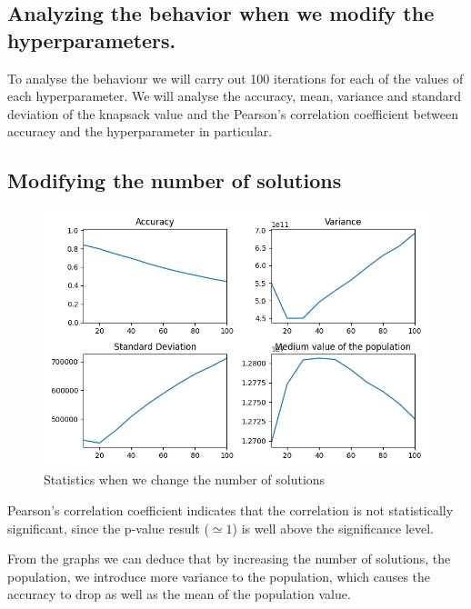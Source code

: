 \documentclass{article}
\begin{document}
    \subsection{Analyzing the behavior when we modify the hyperparameters.}

    To analyse the behaviour we will carry out 100 iterations for each of the values of each hyperparameter.
    We will analyse the accuracy, mean, variance and standard deviation of the knapsack value and the Pearson's correlation coefficient between accuracy
    and the hyperparameter in particular.

    \subsection*{Modifying the number of solutions}

    \begin{figure}[H]

        \centering
        \includegraphics[width=1\textwidth]{../media/ej1/01.NSolutions_behaviour.png}
        \caption{Statistics when we change the number of solutions}
        \label{Statistics when we change the number of solutions}

    \end{figure}

    Pearson's correlation coefficient indicates that the correlation is not statistically significant, 
    since the p-value result ($\simeq 1$) is well above the significance level. 

    From the graphs we can deduce that by increasing the number of solutions, the population, 
    we introduce more variance to the population, which causes the accuracy to drop as well as the mean of the population value.
\end{document}
